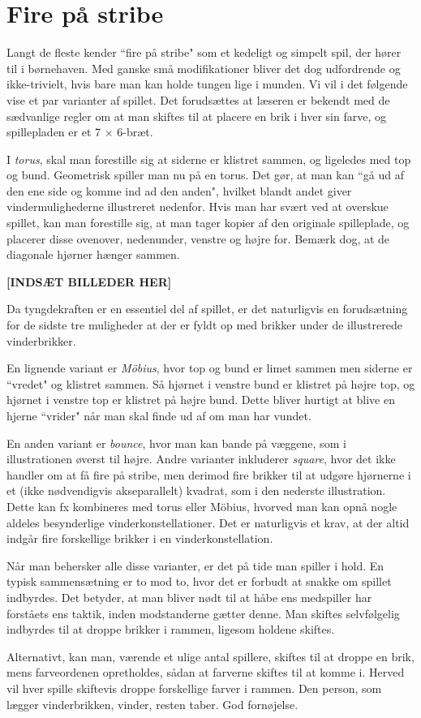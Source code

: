 \chapter{Fire på stribe}

Langt de fleste kender ``fire på stribe" som et kedeligt og simpelt spil, der hører til i børnehaven. Med ganske små modifikationer bliver det dog udfordrende og ikke-trivielt, hvis bare man kan holde tungen lige i munden. Vi vil i det følgende vise et par varianter af spillet. Det forudsættes at læseren er bekendt med de sædvanlige regler om at man skiftes til at placere en brik i hver sin farve, og spillepladen er et 7 $\times$ 6-bræt.

I \textit{torus}, skal man forestille sig at siderne er klistret sammen, og ligeledes med top og bund. Geometrisk spiller man nu på en torus. Det gør, at man kan ``gå ud af den ene side og komme ind ad den anden", hvilket blandt andet giver vindermulighederne illustreret nedenfor. Hvis man har svært ved at overskue spillet, kan man forestille sig, at man tager kopier af den originale spilleplade, og placerer disse ovenover, nedenunder, venstre og højre for. Bemærk dog, at de diagonale hjørner hænger sammen.

{\LARGE\textbf{[INDSÆT BILLEDER HER]}}

 Da tyngdekraften er en essentiel del af spillet, er det naturligvis en forudsætning for de sidste tre muligheder at der er fyldt op med brikker under de illustrerede vinderbrikker.\newline
 
 En lignende variant er \textit{Möbius}, hvor top og bund er limet sammen men siderne er ``vredet" og klistret sammen. Så hjørnet i venstre bund er klistret på højre top, og hjørnet i venstre top er klistret på højre bund. Dette bliver hurtigt at blive en hjerne ``vrider" når man skal finde ud af om man har vundet.
 
 En anden variant er \textit{bounce}, hvor man kan bande på væggene, som i illustrationen øverst til højre. Andre varianter inkluderer \textit{square}, hvor det ikke handler om at få fire på stribe, men derimod fire brikker til at udgøre hjørnerne i et (ikke nødvendigvis akseparallelt) kvadrat, som i den nederste illustration. Dette kan fx kombineres med torus eller Möbius, hvorved man kan opnå nogle aldeles besynderlige vinderkonstellationer. Det er naturligvis et krav, at der altid indgår fire forskellige brikker i en vinderkonstellation.\newline 
 
 Når man behersker alle disse varianter, er det på tide man spiller i hold. En typisk sammensætning er to mod to, hvor det er forbudt at snakke om spillet indbyrdes. Det betyder, at man bliver nødt til at håbe ens medspiller har forståets ens taktik, inden modstanderne gætter denne. Man skiftes selvfølgelig indbyrdes til at droppe brikker i rammen, ligesom holdene skiftes.
 
 Alternativt, kan man, værende et ulige antal spillere, skiftes til at droppe en brik, mens farveordenen opretholdes, sådan at farverne skiftes til at komme i. Herved vil hver spille skiftevis droppe forskellige farver i rammen. Den person, som lægger vinderbrikken, vinder, resten taber. God fornøjelse.